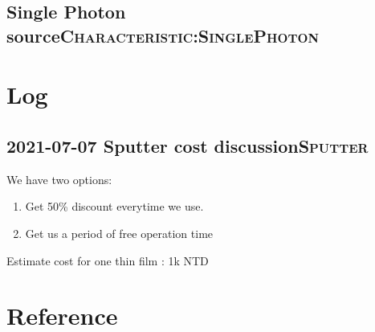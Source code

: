 \documentclass[11pt]{article}
\begin{document}
\subsection*{Single Photon source\hfill{}\textsc{Characteristic:SinglePhoton}}
\label{sec:org8176900}
\section*{Log}
\label{sec:orgd4cd48f}
\subsection*{2021-07-07 Sputter cost discussion\hfill{}\textsc{Sputter}}
\label{sec:org6c6ed9a}
We have two options:
\begin{enumerate}
\item Get 50\% discount everytime we use.
\item Get us a period of free operation time
\end{enumerate}

Estimate cost for one thin film : 1k NTD

\section*{Reference}
\label{sec:orge875147}



\end{document}
